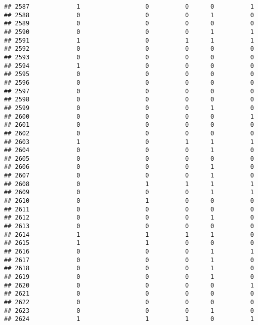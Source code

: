\documentclass[
]{article}
\begin{document}
\begin{verbatim}
## 2587             1                  0          0      0          1
## 2588             0                  0          0      1          0
## 2589             0                  0          0      0          0
## 2590             0                  0          0      1          1
## 2591             1                  0          1      1          1
## 2592             0                  0          0      0          0
## 2593             0                  0          0      0          0
## 2594             1                  0          0      0          0
## 2595             0                  0          0      0          0
## 2596             0                  0          0      0          0
## 2597             0                  0          0      0          0
## 2598             0                  0          0      0          0
## 2599             0                  0          0      1          0
## 2600             0                  0          0      0          1
## 2601             0                  0          0      0          0
## 2602             0                  0          0      0          0
## 2603             1                  0          1      1          1
## 2604             0                  0          0      1          0
## 2605             0                  0          0      0          0
## 2606             0                  0          0      1          0
## 2607             0                  0          0      1          0
## 2608             0                  1          1      1          1
## 2609             0                  0          0      1          1
## 2610             0                  1          0      0          0
## 2611             0                  0          0      0          0
## 2612             0                  0          0      1          0
## 2613             0                  0          0      0          0
## 2614             1                  1          1      1          0
## 2615             1                  1          0      0          0
## 2616             0                  0          0      1          1
## 2617             0                  0          0      1          0
## 2618             0                  0          0      1          0
## 2619             0                  0          0      1          0
## 2620             0                  0          0      0          1
## 2621             0                  0          0      0          0
## 2622             0                  0          0      0          0
## 2623             0                  0          0      1          0
## 2624             1                  1          1      0          1

\end{verbatim}
\end{document}
